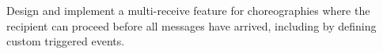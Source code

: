 \begin{goal}
  \label{goal:multirecv}
  Design and implement a multi-receive feature for choreographies
  where the recipient can proceed before all messages have arrived,
  including by defining custom triggered events.
\end{goal}

